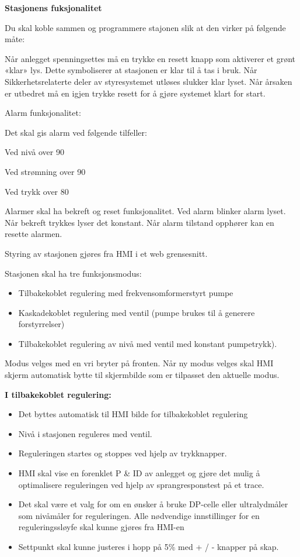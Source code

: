 \textbf{Stasjonens fuksjonalitet}

Du skal koble sammen og programmere stajonen slik at den virker på følgende måte:

\vskip 5pt 

Når anlegget spenningsettes må en trykke en resett knapp som aktiverer et grønt «klar» lys. Dette symboliserer at stasjonen er klar til å tas i bruk. Når Sikkerhetsrelaterte deler av styresystemet utløses slukker klar lyset. Når årsaken er utbedret må en igjen trykke resett for å gjøre systemet klart for start.  

\vskip 5pt 
Alarm funksjonalitet: 

Det skal gis alarm ved følgende tilfeller: 

Ved nivå over 90 %

Ved strømning over 90%

Ved trykk over 80 %

\vskip 5pt 
Alarmer skal ha bekreft og reset funksjonalitet. Ved alarm blinker alarm lyset. Når bekreft trykkes lyser det konstant. Når alarm tilstand opphører kan en resette alarmen.  

\vskip 5pt 
Styring av stasjonen gjøres fra HMI i et web grensesnitt.

\vskip 5pt 
Stasjonen skal ha tre funksjonsmodus: 
\begin{itemize}[noitemsep]
	\item Tilbakekoblet regulering med frekvensomformerstyrt pumpe
	\item Kaskadekoblet regulering med ventil (pumpe brukes til å generere forstyrrelser)
	\item Tilbakekoblet regulering av nivå med ventil med konstant pumpetrykk). 
\end{itemize}

\vskip 5pt 


Modus velges med en vri bryter på fronten. Når ny modus velges skal HMI skjerm automatisk bytte til skjermbilde som er tilpasset den aktuelle modus.   

\vskip 5pt 
\textbf{I tilbakekoblet regulering:} 
\begin{itemize}[noitemsep]
	\item Det byttes automatisk til HMI bilde for tilbakekoblet regulering 
	\item Nivå i stasjonen reguleres med ventil.  
	\item Reguleringen startes og stoppes ved hjelp av trykknapper.   
	\item HMI skal vise en forenklet P \& ID av anlegget og gjøre det mulig å optimalisere reguleringen ved hjelp av sprangresponstest på et trace.  
	\item Det skal være et valg for om en ønsker å bruke DP-celle eller ultralydmåler som nivåmåler for reguleringen. Alle nødvendige innstillinger for en reguleringssløyfe skal kunne gjøres fra HMI-en 
	\item Settpunkt skal kunne justeres i hopp på 5\% med + / - knapper på skap.  

\end{itemize}


